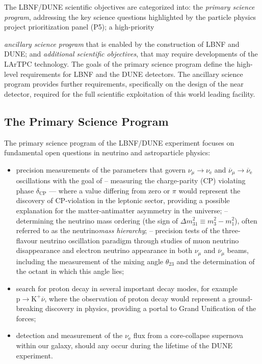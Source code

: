 The LBNF/DUNE scientific objectives are categorized into: the \textit{primary science program}, addressing the key science questions highlighted by the particle physics project prioritization panel (P5); 
a high-priority {\textit{ancillary science program} that is 
enabled by the construction of LBNF and DUNE; and \textit{additional scientific objectives}, that may require developments 
of the LArTPC technology. The goals of the primary science program define the high-level requirements for LBNF and the 
DUNE detectors. The ancillary science program provides further requirements, specifically on the design of the near 
detector, required for the full scientific exploitation of this world leading facility.

\subsection{The Primary Science Program}

The primary science program of the LBNF/DUNE experiment focuses on fundamental open questions in neutrino and astroparticle physics: 
\begin{itemize}
  \item precision measurements of the parameters that govern $\nu_{\mu} \rightarrow \nu_\text{e}$ and
           $\overline{\nu}_{\mu} \rightarrow \overline{\nu}_\text{e}$ oscillations with the goal of
  \subitem -- measuring the charge-parity (CP) violating phase $\delta_\text{CP}$ --- where a value differing from zero or $\pi$ would represent the discovery of CP-violation in the leptonic sector, providing a possible explanation for the matter-antimatter asymmetry in the universe;
  \subitem -- determining the neutrino mass ordering (the sign of $\Delta m^2_{31} \equiv m_3^2-m_1^2$), often referred to as the neutrino\textit{mass hierarchy};  
  \subitem -- precision tests of the three-flavour neutrino oscillation paradigm through studies of muon neutrino disappearance 
    and electron neutrino appearance in both $\nu_\mu$ and $\overline{\nu}_{\mu}$ beams, including the 
    measurement of the mixing angle $\theta_{23}$ and the determination of the octant in which this angle lies;
    \item search for proton decay in several important decay modes, for example $\text{p}\rightarrow\text{K}^+\overline{\nu}$, where the observation of proton decay would represent a ground-breaking discovery in physics, providing a portal to Grand Unification of the forces;
    \item detection and measurement of the $\nu_\text{e}$ flux from a core-collapse supernova within our galaxy, should any occur during the lifetime of the DUNE experiment.
\end{itemize}

}
